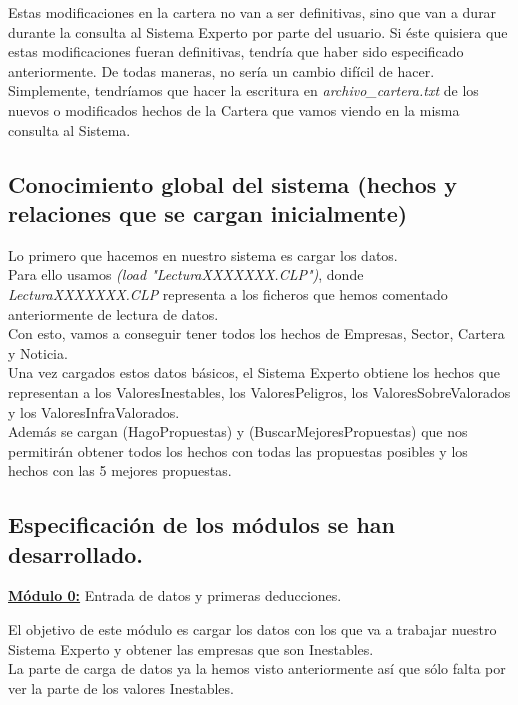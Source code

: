 \documentclass[12pt]{article}
\begin{document}
Estas modificaciones en la cartera no van a ser definitivas, sino que van a durar durante la consulta al Sistema Experto por parte del usuario. Si éste quisiera que estas modificaciones fueran definitivas, tendría que haber sido especificado anteriormente. De todas maneras, no sería un cambio difícil de hacer. Simplemente, tendríamos que hacer la escritura en \textit{archivo\_cartera.txt} de los nuevos o modificados hechos de la Cartera que vamos viendo en la misma consulta al Sistema. \\


\subsection{Conocimiento global del sistema (hechos y relaciones que se cargan
	inicialmente)}
Lo primero que hacemos en nuestro sistema es cargar los datos.\\
Para ello usamos \textit{(load "LecturaXXXXXXX.CLP")}, donde \textit{LecturaXXXXXXX.CLP} representa a los ficheros que hemos comentado anteriormente de lectura de datos.\\ 
Con esto, vamos a conseguir tener todos los hechos de Empresas, Sector, Cartera y Noticia.\\

Una vez cargados estos datos básicos, el Sistema Experto obtiene los hechos que representan a los ValoresInestables, los ValoresPeligros, los ValoresSobreValorados y los ValoresInfraValorados. \\

Además se cargan (HagoPropuestas) y (BuscarMejoresPropuestas) que nos permitirán obtener todos los hechos con todas las propuestas posibles y los hechos con las 5 mejores propuestas.   


\subsection{Especificación de los módulos se han desarrollado.}
\begin{center}
	\underline{\textbf{Módulo 0:}} Entrada de datos y primeras deducciones.
\end{center}
El objetivo de este módulo es cargar los datos con los que va a trabajar nuestro Sistema Experto y obtener las empresas que son Inestables.\\

La parte de carga de datos ya la hemos visto anteriormente así que sólo falta por ver la parte de los valores Inestables. \\
\end{document}

